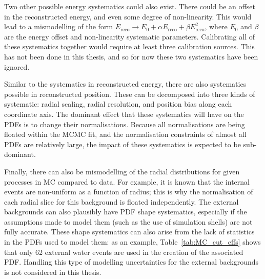 Two other possible energy systematics could also exist. There could be an offset in the reconstructed energy, and even some degree of non-linearity. This would lead to a mismodelling of the form $E_{\mathrm{reco}}\to E_{0} + \alpha E_{\mathrm{reco}} +\beta E_{\mathrm{reco}}^{2}$, where $E_{0}$ and $\beta$ are the energy offset and non-linearity systematic parameters. Calibrating all of these systematics together would require at least three calibration sources. This has not been done in this thesis, and so for now these two systematics have been ignored.

Similar to the systematics in reconstructed energy, there are also systematics possible in reconstructed position. These can be decomposed into three kinds of systematic: radial scaling, radial resolution, and position bias along each coordinate axis. The dominant effect that these systematics will have on the PDFs is to change their normalisations. Because all normalisations are being floated within the MCMC fit, and the normalisation constraints of almost all PDFs are relatively large, the impact of these systematics is expected to be sub-dominant.

Finally, there can also be mismodelling of the radial distributions for given processes in MC compared to data. For example, it is known that the internal  events are non-uniform as a function of radius; this is why the normalisation of each radial slice for this background is floated independently. The external backgrounds can also plausibly have PDF shape systematics, especially if the assumptions made to model them (such as the use of simulation shells) are not fully accurate. These shape systematics can also arise from the lack of statistics in the PDFs used to model them: as an example, Table~\ref{tab:MC_cut_effs} shows that only 62 external water  events are used in the creation of the associated PDF. Handling this type of modelling uncertainties for the external backgrounds is not considered in this thesis.



